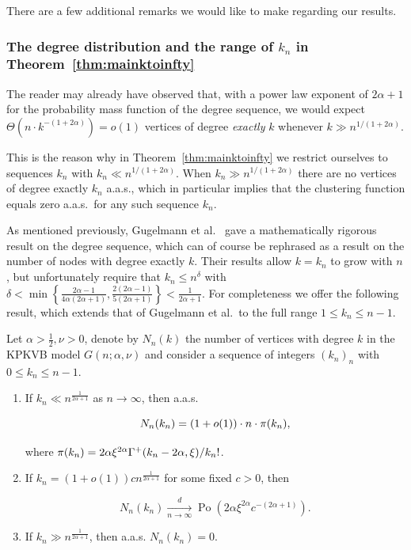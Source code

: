 There are a few additional remarks we would like to make regarding our results.

\subsubsection{The degree distribution and the range of \texorpdfstring{$k_n$}{kn} in Theorem~\ref{thm:mainktoinfty}}

The reader may already have observed that, with a power law exponent of $2\alpha+1$ for the probability mass function of 
the degree sequence, we would expect $\Theta( n \cdot k^{-(1+2\alpha)} ) = o(1)$ vertices of degree {\em exactly} $k$ whenever
$k \gg n^{1/(1+2\alpha)}$.

This is the reason why in Theorem~\ref{thm:mainktoinfty} we restrict ourselves to 
sequences $k_n$ with $k_n \ll n^{1/(1+2\alpha)}$. 
When  $k_n \gg n^{1/(1+2\alpha)}$ there are no vertices of degree exactly $k_n$ a.a.s., which in particular
implies that the clustering function equals zero a.a.s.~for any such sequence $k_n$.

As mentioned previously, Gugelmann et al.~\cite{gugelmann2012random} gave a mathematically rigorous result on the degree sequence, which can of course be rephrased as a result on the number of nodes with degree exactly $k$. 
Their results allow $k = k_n$ to grow with $n$, but unfortunately require that $k_n \leq n^\delta$ with 
$\delta < \min\left\{\frac{2\alpha-1}{4\alpha(2\alpha +1)}, \frac{2(2\alpha -1)}{5(2\alpha + 1)}\right\} < \frac{1}{2\alpha + 1}$.
For completeness we offer the following result, which extends that of Gugelmann et al.~to the full range $1 \le k_n \le n-1$. 

\begin{theorem}\label{thm:degrees_hyperbolic}
Let $\alpha >\frac{1}{2}, \nu > 0$, denote by $N_n(k)$ the number of vertices with degree $k$ in the KPKVB model $G(n;\alpha,\nu)$ and 
consider a sequence of integers $(k_n)_n$ with $0 \leq k_n \leq n-1$.
\begin{enumerate}
\item If $k_n \ll n^{\frac{1}{2\alpha+1}} $ as $n\rightarrow \infty$, then a.a.s.

$$N_n(k_n) = (1+o(1)) \cdot n \cdot {\pi}(k_n),$$

where ${\pi}(k_n) = 2\alpha \xi^{2\alpha}\Gamma^+(k_n-2\alpha,\xi)/k_n!$.

\item If $k_n = (1+o(1))c n^{\frac{1}{2\alpha+1}}$ for some fixed $c >0$, then

$$ N_n(k_n) \xrightarrow[n\rightarrow\infty]{d} \operatorname{Po}(2\alpha \xi^{2\alpha} c^{-(2\alpha+1)}). $$

\item If $k_n \gg n^{\frac{1}{2\alpha+1}}$, then a.a.s. $N_n(k_n) = 0$.
\end{enumerate}
\end{theorem}




